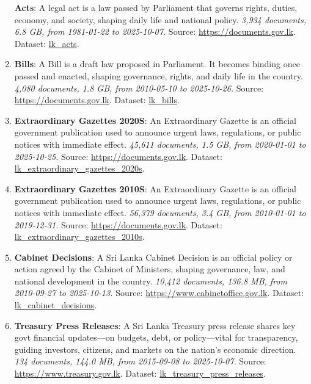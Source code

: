 \documentclass[10pt,a4paper]{article}%
\begin{document}
\begin{enumerate}
\textbf{Acts}: A legal act is a law passed by Parliament that governs rights, duties, economy, and society, shaping daily life and national policy.\textit{ 3,934 documents, 6.8 GB, from 1981{-}01{-}22 to 2025{-}10{-}07.} Source: \href{https://documents.gov.lk}{https://documents.gov.lk}. Dataset: \href{https://github.com/nuuuwan/lk\_legal\_docs/tree/data\_lk\_acts/data/lk\_acts}{lk\_acts}.%
\item%
\textbf{Bills}: A Bill is a draft law proposed in Parliament. It becomes binding once passed and enacted, shaping governance, rights, and daily life in the country.\textit{ 4,080 documents, 1.8 GB, from 2010{-}05{-}10 to 2025{-}10{-}26.} Source: \href{https://documents.gov.lk}{https://documents.gov.lk}. Dataset: \href{https://github.com/nuuuwan/lk\_legal\_docs/tree/data\_lk\_bills/data/lk\_bills}{lk\_bills}.%
\item%
\textbf{Extraordinary Gazettes 2020S}: An Extraordinary Gazette is an official government publication used to announce urgent laws, regulations, or public notices with immediate effect.\textit{ 45,611 documents, 1.5 GB, from 2020{-}01{-}01 to 2025{-}10{-}25.} Source: \href{https://documents.gov.lk}{https://documents.gov.lk}. Dataset: \href{https://github.com/nuuuwan/lk\_legal\_docs/tree/data\_lk\_extraordinary\_gazettes\_2020s/data/lk\_extraordinary\_gazettes\_2020s}{lk\_extraordinary\_gazettes\_2020s}.%
\item%
\textbf{Extraordinary Gazettes 2010S}: An Extraordinary Gazette is an official government publication used to announce urgent laws, regulations, or public notices with immediate effect.\textit{ 56,379 documents, 3.4 GB, from 2010{-}01{-}01 to 2019{-}12{-}31.} Source: \href{https://documents.gov.lk}{https://documents.gov.lk}. Dataset: \href{https://github.com/nuuuwan/lk\_legal\_docs/tree/data\_lk\_extraordinary\_gazettes\_2010s/data/lk\_extraordinary\_gazettes\_2010s}{lk\_extraordinary\_gazettes\_2010s}.%
\item%
\textbf{Cabinet Decisions}: A Sri Lanka Cabinet Decision is an official policy or action agreed by the Cabinet of Ministers, shaping governance, law, and national development in the country.\textit{ 10,412 documents, 136.8 MB, from 2010{-}09{-}27 to 2025{-}10{-}13.} Source: \href{https://www.cabinetoffice.gov.lk}{https://www.cabinetoffice.gov.lk}. Dataset: \href{https://github.com/nuuuwan/lk\_cabinet\_decisions/tree/data/data/lk\_cabinet\_decisions}{lk\_cabinet\_decisions}.%
\item%
\textbf{Treasury Press Releases}: A Sri Lanka Treasury press release shares key govt financial updates—on budgets, debt, or policy—vital for transparency, guiding investors, citizens, and markets on the nation’s economic direction.\textit{ 134 documents, 144.0 MB, from 2015{-}09{-}08 to 2025{-}10{-}07.} Source: \href{https://www.treasury.gov.lk}{https://www.treasury.gov.lk}. Dataset: \href{https://github.com/nuuuwan/lk\_treasury/tree/data\_lk\_treasury\_press\_releases/data/lk\_treasury\_press\_releases}{lk\_treasury\_press\_releases}.%

\end{enumerate}
\end{document}
